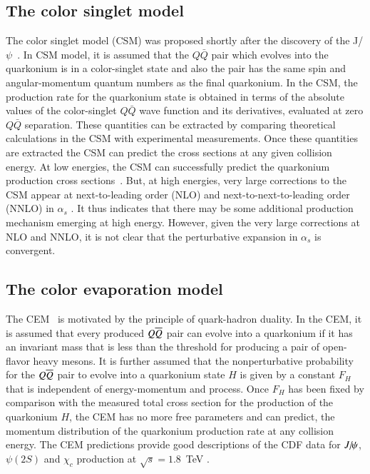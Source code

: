 \subsection{The color singlet model}

The color singlet model (CSM) was proposed shortly after the discovery of the 
J/$\psi$~\cite{Einhorn:1975ua,Berger:1980ni,Ellis:1976fj,Carlson:1976cd}.
In CSM model, it is assumed that the $Q\bar Q$ pair which evolves into
the quarkonium is in a color-singlet state and also the pair has the same spin
and angular-momentum quantum numbers as the final quarkonium.
In the CSM, the production rate for the quarkonium state is obtained in terms of 
the absolute values of the color-singlet $Q\bar Q$ wave function and its
derivatives, evaluated at zero $Q\bar Q$ separation.
These quantities can be extracted by comparing theoretical 
calculations in the CSM with experimental measurements. Once these quantities 
are extracted the CSM  can predict the cross sections at any given collision energy.
At low energies, the CSM can successfully  predict the quarkonium
production cross sections~\cite{Schuler:1994hy}.
But, at high energies, very large corrections to the CSM appear at next-to-leading
order (NLO) and next-to-next-to-leading order (NNLO) in $\alpha_s$
\cite{Artoisenet:2007xi,Campbell:2007ws,Artoisenet:2008fc}.
It thus indicates that there may be some additional production mechanism emerging at
high energy. However, given the very large corrections at
NLO and NNLO, it is not clear that the perturbative expansion in
$\alpha_s$ is convergent. 

\subsection{The color evaporation model}  
\label{prod_sec:CEM}

The CEM~\cite{Fritzsch:1977ay,Amundson:1995em,Amundson:1996qr}
is motivated by the principle of quark-hadron duality. In the CEM, it
is assumed that every produced $Q \overline{Q}$ pair can evolve into a quarkonium
if it has an invariant mass that is less than the threshold for
producing a pair of open-flavor heavy mesons. It is further assumed that
the nonperturbative probability for the $Q \overline{Q}$ pair to evolve into a
quarkonium state $H$ is given by a constant $F_H$ that is independent of 
energy-momentum and process. Once $F_H$ has been fixed by
comparison with the measured total cross section for the production of
the quarkonium $H$, the CEM has no more free parameters and
can predict, the momentum distribution of the quarkonium production rate
at any collision energy.
The CEM predictions provide good descriptions of the CDF data for $J\hspace{-.08em}/\hspace{-.14em}\psi$,
$\psi(2S)$ and $\chi_{c}$ production at $\sqrt{s}=1.8$~TeV
\cite{Amundson:1996qr}. 


